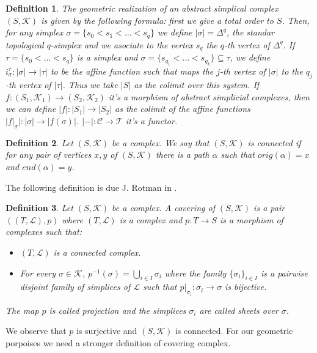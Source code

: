 \documentclass{amsart}
\newtheorem{definition}{Definition}[section]
\begin{document}
\begin{definition}
The geometric realization of an abstract simplical complex $(S,\mathcal{K})$ is given by the following formula: first we give a total order to $S$. Then, for any simplex $\sigma=\{s_{0}<s_{1}<\ldots<s_{q}\}$ we define $|\sigma|=\Delta^{q}$, the standar topological $q$-simplex and we asociate to the vertex $s_{q}$ the $q$-th vertex of $\Delta^{q}$. If $\tau=\{s_{0}<\ldots<s_{q}\}$ is a simplex and $\sigma=\{s_{q_{1}}<\ldots<s_{q_{k}}\}\subseteq\tau$, we define $i_{\sigma}^{\tau}\colon|\sigma|\to|\tau|$ to be the affine function such that maps the $j$-th vertex of $|\sigma|$ to the $q_{j}$-th vertex of $|\tau|$. Thus we take $|S|$ as the colimit over this system. If $f\colon(S_{1},\mathcal{K}_{1})\to(S_{2},\mathcal{K}_{2})$ it's a morphism of abstract simplicial complexes, then we can define $|f|\colon|S_{1}|\to|S_{2}|$ as the colimit of the affine functions $|f|_{\sigma}|\colon|\sigma|\to|f(\sigma)|$. $|-|\colon\mathcal{C}\to\mathcal{T}$ it's a functor.
\end{definition}

\begin{definition}
Let $(S,\mathcal{K})$ be a complex. We say that $(S,\mathcal{K})$ is connected if for any pair of vertices $x,y$ of $(S,\mathcal{K})$ there is a path $\alpha$ such that $orig(\alpha)=x$ and $end(\alpha)=y$.
\end{definition}

The following definition is due J. Rotman in \cite{rotman1973covering}.

\begin{definition}
Let $(S,\mathcal{K})$ be a complex. A covering of $(S,\mathcal{K})$ is a pair $((T,\mathcal{L}),p)$ where $(T,\mathcal{L})$ is a complex and $p\colon T\longrightarrow S$ is a morphism of complexes such that:
\begin{itemize}
\item $(T,\mathcal{L})$ is a connected complex.
\item For every $\sigma\in\mathcal{K}$, $p^{-1}(\sigma)=\bigcup_{i\in I}\sigma_i$ where the family $\{\sigma_i\}_{i\in I}$ is a pairwise disjoint family of simplices of $\mathcal{L}$ such that $p|_{\sigma_i}\colon \sigma_i\longrightarrow \sigma$ is bijective.
\end{itemize}
The map $p$ is called projection and the simplices $\sigma_i$ are called sheets over $\sigma$.
\end{definition}

We observe that $p$ is surjective and $(S,\mathcal{K})$ is connected. For our geometric porpoises we need a stronger definition of covering complex.
\end{document}

